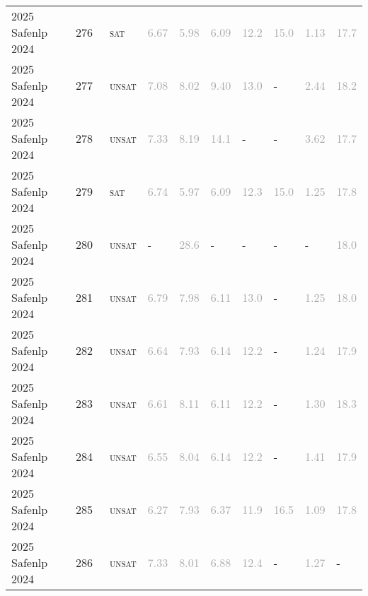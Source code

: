 \begin{center}
{\begin{longtable}{@{}llllllllll@{}}
2025 Safenlp 2024 & 276 & ~\textsc{sat} & \textcolor{darkgray}{6.67} & \textcolor{darkgray}{5.98} & \textcolor{darkgray}{6.09} & \textcolor{darkgray}{12.2} & \textcolor{darkgray}{15.0} & \textcolor{darkgray}{1.13} & \textcolor{darkgray}{17.7} \\
2025 Safenlp 2024 & 277 & ~\textsc{unsat} & \textcolor{darkgray}{7.08} & \textcolor{darkgray}{8.02} & \textcolor{darkgray}{9.40} & \textcolor{darkgray}{13.0} & - & \textcolor{darkgray}{2.44} & \textcolor{darkgray}{18.2} \\
2025 Safenlp 2024 & 278 & ~\textsc{unsat} & \textcolor{darkgray}{7.33} & \textcolor{darkgray}{8.19} & \textcolor{darkgray}{14.1} & - & - & \textcolor{darkgray}{3.62} & \textcolor{darkgray}{17.7} \\
2025 Safenlp 2024 & 279 & ~\textsc{sat} & \textcolor{darkgray}{6.74} & \textcolor{darkgray}{5.97} & \textcolor{darkgray}{6.09} & \textcolor{darkgray}{12.3} & \textcolor{darkgray}{15.0} & \textcolor{darkgray}{1.25} & \textcolor{darkgray}{17.8} \\
2025 Safenlp 2024 & 280 & ~\textsc{unsat} & - & \textcolor{darkgray}{28.6} & - & - & - & - & \textcolor{darkgray}{18.0} \\
2025 Safenlp 2024 & 281 & ~\textsc{unsat} & \textcolor{darkgray}{6.79} & \textcolor{darkgray}{7.98} & \textcolor{darkgray}{6.11} & \textcolor{darkgray}{13.0} & - & \textcolor{darkgray}{1.25} & \textcolor{darkgray}{18.0} \\
2025 Safenlp 2024 & 282 & ~\textsc{unsat} & \textcolor{darkgray}{6.64} & \textcolor{darkgray}{7.93} & \textcolor{darkgray}{6.14} & \textcolor{darkgray}{12.2} & - & \textcolor{darkgray}{1.24} & \textcolor{darkgray}{17.9} \\
2025 Safenlp 2024 & 283 & ~\textsc{unsat} & \textcolor{darkgray}{6.61} & \textcolor{darkgray}{8.11} & \textcolor{darkgray}{6.11} & \textcolor{darkgray}{12.2} & - & \textcolor{darkgray}{1.30} & \textcolor{darkgray}{18.3} \\
2025 Safenlp 2024 & 284 & ~\textsc{unsat} & \textcolor{darkgray}{6.55} & \textcolor{darkgray}{8.04} & \textcolor{darkgray}{6.14} & \textcolor{darkgray}{12.2} & - & \textcolor{darkgray}{1.41} & \textcolor{darkgray}{17.9} \\
2025 Safenlp 2024 & 285 & ~\textsc{unsat} & \textcolor{darkgray}{6.27} & \textcolor{darkgray}{7.93} & \textcolor{darkgray}{6.37} & \textcolor{darkgray}{11.9} & \textcolor{darkgray}{16.5} & \textcolor{darkgray}{1.09} & \textcolor{darkgray}{17.8} \\
2025 Safenlp 2024 & 286 & ~\textsc{unsat} & \textcolor{darkgray}{7.33} & \textcolor{darkgray}{8.01} & \textcolor{darkgray}{6.88} & \textcolor{darkgray}{12.4} & - & \textcolor{darkgray}{1.27} & - \\

\end{longtable}}
\end{center}
